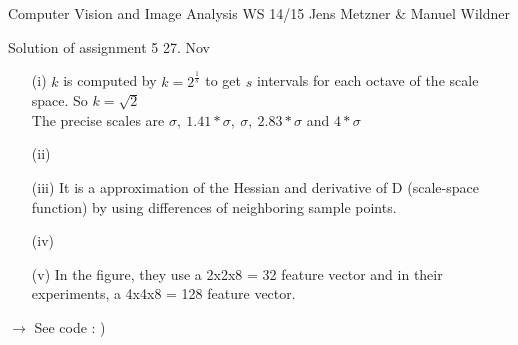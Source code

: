 \documentclass[10pt,a4paper]{scrartcl}
\begin{document}
\uebkopfzeile
  {Computer Vision and Image Analysis} %
  {WS 14/15}  %
  {}    %
  {Jens Metzner \& Manuel Wildner}    %

\uebtitel
{Solution of assignment 5} %
{27. Nov} %


\begin{itemize}
	\item[(i)] $k$ is computed by $k = 2^\frac{1}{s}$ to get $s$ intervals for each octave of the scale space. So $k = \sqrt{2}$\\
	The precise scales are $\sigma,\ 1.41*\sigma,\ \sigma,\ 2.83*\sigma$ and $4*\sigma$
	\item[(ii)]
	\item[(iii)] It is a approximation of the Hessian and derivative of D (scale-space function) by using differences of neighboring sample points.
	\item[(iv)]
	\item[(v)] In the figure, they use a 2x2x8 = 32 feature vector and in their experiments, a 4x4x8 = 128 feature vector.
\end{itemize}

$\rightarrow$ See code : )
\end{document}
